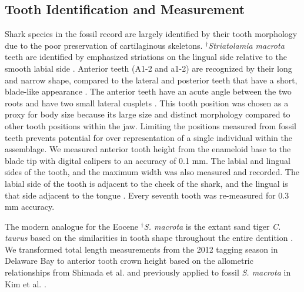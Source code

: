 \documentclass[]{rsos}%
\begin{document}
\subsection{Tooth Identification and Measurement}
Shark species in the fossil record are largely identified by their tooth morphology \cite{Cappetta2012} due to the poor preservation of cartilaginous skeletons. 
${}^\dag$\emph{Striatolamia macrota} teeth are identified by emphasized striations on the lingual side relative to the smooth labial side \cite{Cappetta2012}. 
Anterior teeth (A1-2 and a1-2) are recognized by their long and narrow shape, compared to the lateral and posterior teeth that have a short, blade-like appearance \cite{Cunningham2000}. 
The anterior teeth have an acute angle between the two roots and have two small lateral cusplets \cite{Padilla2014, Cappetta2012}. 
This tooth position was chosen as a proxy for body size because its large size and distinct morphology compared to other tooth positions within the jaw. 
Limiting the positions measured from fossil teeth prevents potential for over representation of a single individual within the assemblage. 
We measured anterior tooth height from the enameloid base to the blade tip with digital calipers to an accuracy of 0.1 mm. 
The labial and lingual sides of the tooth, and the maximum width was also measured and recorded. 
The labial side of the tooth is adjacent to the cheek of the shark, and the lingual is that side adjacent to the tongue \cite{Cappetta2012}.  
Every seventh tooth was re-measured for 0.3 mm accuracy. 

The modern analogue for the Eocene ${}^\dag$\emph{S. macrota} is the extant sand tiger \emph{C. taurus} based on the similarities in tooth shape throughout the entire dentition \cite{Cunningham2000}. 
We transformed total length measurements from the 2012 tagging season in Delaware Bay \cite{haulsee2016implantation, haulsee2018spatial, Teter2015, kilfoil2017targeted} to anterior tooth crown height based on the allometric relationships from Shimada et al. \cite{Shimada2002} and previously applied to fossil \emph{S. macrota} in Kim et al. \cite{Kim2020}. %
\end{document}
